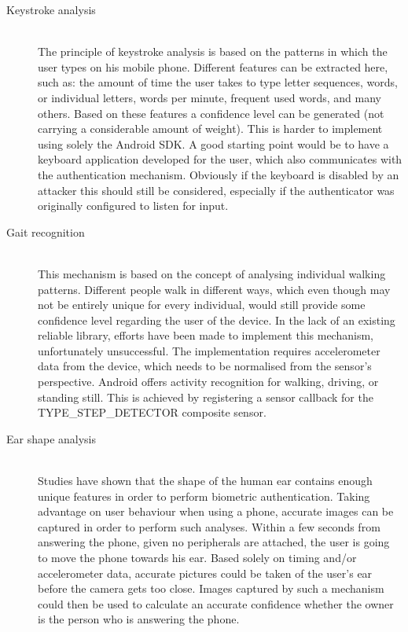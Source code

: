 \begin{description}
  \item[Keystroke analysis] \hfill \\
  The principle of keystroke analysis is based on the patterns in which the user types on his mobile phone. Different features can be extracted here, such as: the amount of time the user takes to type letter sequences, words, or individual letters, words per minute, frequent used words, and many others. Based on these features a confidence level can be generated (not carrying a considerable amount of weight). This is harder to implement using solely the Android SDK. A good starting point would be to have a keyboard application developed for the user, which also communicates with the authentication mechanism. Obviously if the keyboard is disabled by an attacker this should still be considered, especially if the authenticator was originally configured to listen for input.
  
  \item[Gait recognition] \hfill \\
  This mechanism is based on the concept of analysing individual walking patterns. Different people walk in different ways, which even though may not be entirely unique for every individual, would still provide some confidence level regarding the user of the device. In the lack of an existing reliable library, efforts have been made to implement this mechanism, unfortunately unsuccessful. The implementation requires accelerometer data from the device, which needs to be normalised from the sensor's perspective. Android offers activity recognition for walking, driving, or standing still. This is achieved by registering a sensor callback for the TYPE\_STEP\_DETECTOR composite sensor.
  
  \item[Ear shape analysis] \hfill \\
  Studies have shown \cite{} that the shape of the human ear contains enough unique features in order to perform biometric authentication. Taking advantage on user behaviour when using a phone, accurate images can be captured in order to perform such analyses. Within a few seconds from answering the phone, given no peripherals are attached, the user is going to move the phone towards his ear. Based solely on timing and/or accelerometer data, accurate pictures could be taken of the user's ear before the camera gets too close. Images captured by such a mechanism could then be used to calculate an accurate confidence whether the owner is the person who is answering the phone.
  

\end{description}

